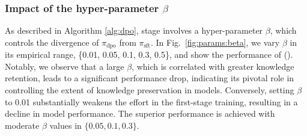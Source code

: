 \subsubsection{Impact of the hyper-parameter $\beta$} 
As described in Algorithm \ref{alg:dpo}, \QDPO stage involves a hyper-parameter $\beta$, which controls the divergence of $\pi_\mathrm{dpo}$ from $\pi_\mathrm{sft}$.
In Fig.~\ref{fig:params:beta}, we vary $\beta$ in its empirical range, \{0.01, 0.05, 0.1, 0.3, 0.5\}, and show the performance of \LLMQO (\QDPO).
Notably, we observe that a large $\beta$, which is correlated with greater knowledge retention, leads to a significant performance drop, indicating its pivotal role in controlling the extent of knowledge  preservation in \QDPO models. 
Conversely, setting $\beta$ to 0.01 substantially weakens the effort in the first-stage training, resulting in a decline in model performance.
The superior performance is achieved with moderate $\beta$ values in 
$\{0.05, 0.1, 0.3\}$.

